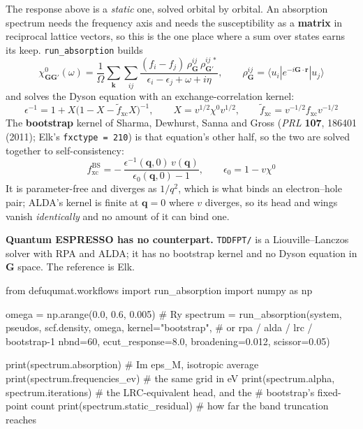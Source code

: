 \documentclass[11pt,a4paper]{article}
\newcommand{\code}[1]{\texttt{\small #1}}
\begin{document}
The response above is a \emph{static} one, solved orbital by orbital. An
absorption spectrum needs the frequency axis and needs the susceptibility as a
\textbf{matrix} in reciprocal lattice vectors, so this is the one place where a
sum over states earns its keep. \code{run\_absorption} builds
\begin{equation*}
\chi^0_{\mathbf{GG}'}(\omega) = \frac{1}{\Omega}\sum_{\mathbf k}\sum_{ij}
  \frac{(f_i - f_j)\,\rho^{ij}_{\mathbf G}\,\rho^{ij\,*}_{\mathbf G'}}
       {\epsilon_i - \epsilon_j + \omega + i\eta},
\qquad
\rho^{ij}_{\mathbf G} = \langle u_i|e^{-i\mathbf G\cdot\mathbf r}|u_j\rangle
\end{equation*}
and solves the Dyson equation with an exchange-correlation kernel:
\begin{equation*}
\epsilon^{-1} = 1 + X\big(1 - X - \tilde f_{\mathrm{xc}} X\big)^{-1},
\qquad X = v^{1/2}\chi^0 v^{1/2},
\qquad \tilde f_{\mathrm{xc}} = v^{-1/2} f_{\mathrm{xc}} v^{-1/2}
\end{equation*}
The \textbf{bootstrap} kernel of Sharma, Dewhurst, Sanna and Gross
(\emph{PRL} \textbf{107}, 186401 (2011); Elk's \code{fxctype = 210}) is that
equation's other half, so the two are solved together to self-consistency:
\begin{equation*}
f^{\mathrm{BS}}_{\mathrm{xc}}
  = -\,\frac{\epsilon^{-1}(\mathbf q, 0)\,v(\mathbf q)}{\epsilon_0(\mathbf q,0)-1},
\qquad \epsilon_0 = 1 - v\chi^0
\end{equation*}
It is parameter-free and diverges as $1/q^2$, which is what binds an
electron--hole pair; ALDA's kernel is finite at $\mathbf q = 0$ where $v$
diverges, so its head and wings vanish \emph{identically} and no amount of it
can bind one.

\textbf{Quantum ESPRESSO has no counterpart.} \code{TDDFPT/} is a
Liouville--Lanczos solver with RPA and ALDA; it has no bootstrap kernel and no
Dyson equation in $\mathbf G$ space. The reference is Elk.

\begin{pycode}
from defuqumat.workflows import run_absorption
import numpy as np

omega = np.arange(0.0, 0.6, 0.005)          # Ry
spectrum = run_absorption(system, pseudos, scf.density, omega,
                          kernel="bootstrap",   # or rpa / alda / lrc / bootstrap-1
                          nbnd=60, ecut_response=8.0,
                          broadening=0.012, scissor=0.05)

print(spectrum.absorption)                  # Im eps_M, isotropic average
print(spectrum.frequencies_ev)              # the same grid in eV
print(spectrum.alpha, spectrum.iterations)  # the LRC-equivalent head, and the
                                            # bootstrap's fixed-point count
print(spectrum.static_residual)             # how far the band truncation reaches
\end{pycode}
\end{document}
